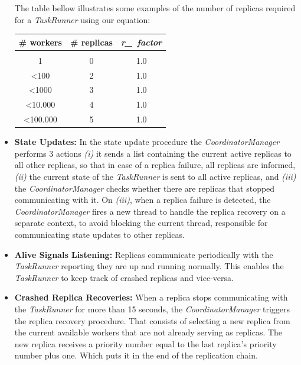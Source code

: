 \documentclass[times, 10pt,twocolumn]{article}
\begin{document}
\begin{itemize}
                The table bellow illustrates some examples of the number of replicas required for a \textit{TaskRunner} using our equation:
            
                \begin{table}[!h]
                    \centering
                    \begin{tabular}{c c c}
                        \toprule \# workers & \# replicas & \textit{r\_~factor} \\
                        \midrule\vspace{-8pt} \\
                        1 & 0 & 1.0\\ 
                        \textless 100 & 2 & 1.0 \\ 
                        \textless 1000 & 3 & 1.0 \\ 
                        \textless 10.000 & 4 & 1.0 \\ 
                        \textless 100.000 & 5 & 1.0 \\ 
                        \bottomrule 
                    \end{tabular} 
                \end{table}
                
                \item[] {\bfseries State Updates:} In the state update procedure the \textit{CoordinatorManager} performs 3 actions \textit{(i)} it sends a list containing the current active replicas to all other replicas, so that in case of a replica failure, all replicas are informed, \textit{(ii)} the current state of the \textit{TaskRunner} is sent to all active replicas, and \textit{(iii)} the \textit{CoordinatorManager} checks whether there are replicas that stopped communicating with it. On \textit{(iii)}, when a replica failure is detected, the \textit{CoordinatorManager} fires a new thread to handle the replica recovery on a separate context, to avoid blocking the current thread, responsible for communicating state updates to other replicas.
                
                \item[] {\bfseries Alive Signals Listening:} Replicas communicate periodically with the \textit{TaskRunner} reporting they are up and running normally. This enables the \textit{TaskRunner} to keep track of crashed replicas and vice-versa.
                
                \item[] {\bfseries Crashed Replica Recoveries:} When a replica stops communicating with the \textit{TaskRunner} for more than 15 seconds, the \textit{CoordinatorManager} triggers the replica recovery procedure. That consists of selecting a new replica from the current available workers that are not already serving as replicas. The new replica receives a priority number equal to the last replica's priority number plus one. Which puts it in the end of the replication chain.
                
            \end{itemize}
            
\end{document}
